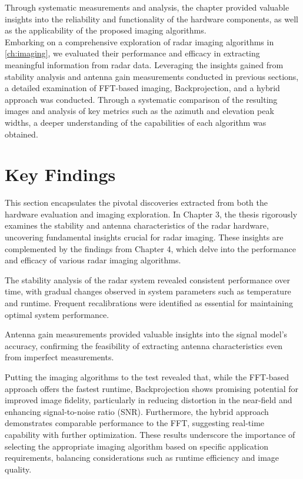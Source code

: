 Through systematic measurements and analysis, the chapter provided valuable insights 
into the reliability and functionality of the hardware components,
as well as the applicability of the proposed imaging algorithms.
\\
Embarking on a comprehensive exploration of radar imaging algorithms in \autoref{ch:imaging},
we evaluated their performance and efficacy in extracting meaningful information from radar data.
Leveraging the insights gained from stability analysis and antenna gain measurements
conducted in previous sections, a detailed examination of FFT-based imaging,
Backprojection, and a hybrid approach was conducted.
Through a systematic comparison of the resulting images and analysis of key metrics
such as the azimuth and elevation peak widths, a deeper understanding of the capabilities
of each algorithm was obtained.

\section{Key Findings}
This section encapsulates the pivotal discoveries extracted from both the hardware evaluation and imaging exploration.
In Chapter 3, the thesis rigorously examines the stability and antenna characteristics of the radar hardware,
uncovering fundamental insights crucial for radar imaging. These insights are complemented by the findings from Chapter 4,
which delve into the performance and efficacy of various radar imaging algorithms. 

The stability analysis of the radar system revealed consistent performance over time,
with gradual changes observed in system parameters such as temperature and runtime.
Frequent recalibrations were identified as essential for maintaining optimal system performance.

Antenna gain measurements provided valuable insights into the signal model's accuracy,
confirming the feasibility of extracting antenna characteristics even from imperfect measurements.

Putting the imaging algorithms to the test revealed that,
while the FFT-based approach offers the fastest runtime, Backprojection shows promising potential
for improved image fidelity, particularly in reducing distortion in the near-field
and enhancing signal-to-noise ratio (SNR). Furthermore, the hybrid approach demonstrates
comparable performance to the FFT, suggesting real-time capability with further optimization.
These results underscore the importance of selecting the appropriate imaging algorithm based
on specific application requirements, balancing considerations such as runtime efficiency
and image quality.

